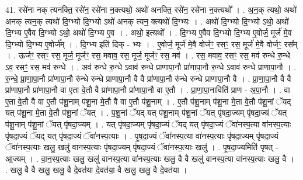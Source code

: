 \documentclass[17pt]{extarticle}
\begin{document}
41. रसे॑ना नक् त्यनक्ति॒ रसे॑न॒ रसे॑ना न॒क्त्यथो॒ अथो॑ अनक्ति॒ रसे॑न॒ रसे॑ना न॒क्त्यथो᳚ । . अ॒न॒क् त्यथो॒ अथो॑ अनक् त्यन॒क् त्यथो॑ दि॒ग्भ्यो दि॒ग्भ्यो ऽथो॑ अनक् त्यन॒ क्त्यथो॑ दि॒ग्भ्यः । . अथो॑ दि॒ग्भ्यो दि॒ग्भ्यो ऽथो॒ अथो॑ दि॒ग्भ्य ए॒वैव दि॒ग्भ्यो ऽथो॒ अथो॑ दि॒ग्भ्य ए॒व । . अथो॒ इत्यथो᳚ । . दि॒ग्भ्य ए॒वैव दि॒ग्भ्यो दि॒ग्भ्य ए॒वोर्ज॒ मूर्ज॑ मे॒व दि॒ग्भ्यो दि॒ग्भ्य ए॒वोर्ज᳚म् । . दि॒ग्भ्य इति॑ दिक् - भ्यः । . ए॒वोर्ज॒ मूर्ज॑ मे॒वै वोर्जꣳ॒॒ रसꣳ॒॒ रस॒ मूर्ज॑ मे॒वै वोर्जꣳ॒॒ रस᳚म् । . ऊर्जꣳ॒॒ रसꣳ॒॒ रस॒ मूर्ज॒ मूर्जꣳ॒॒ रस॒ मवाव॒ रस॒ मूर्ज॒ मूर्जꣳ॒॒ रस॒ मव॑ । . रस॒ मवाव॒ रसꣳ॒॒ रस॒ मव॑ रुन्धे रु॒न्धे ऽव॒ रसꣳ॒॒ रस॒ मव॑ रुन्धे । . अव॑ रुन्धे रु॒न्धे ऽवाव॑ रुन्धे प्राणापा॒नौ प्रा॑णापा॒नौ रु॒न्धे ऽवाव॑ रुन्धे प्राणापा॒नौ । . रु॒न्धे॒ प्रा॒णा॒पा॒नौ प्रा॑णापा॒नौ रु॑न्धे रुन्धे प्राणापा॒नौ वै वै प्रा॑णापा॒नौ रु॑न्धे रुन्धे प्राणापा॒नौ वै । . प्रा॒णा॒पा॒नौ वै वै प्रा॑णापा॒नौ प्रा॑णापा॒नौ वा ए॒ता वे॒तौ वै प्रा॑णापा॒नौ प्रा॑णापा॒नौ वा ए॒तौ । . प्रा॒णा॒पा॒नाविति॑ प्राण - अ॒पा॒नौ । . वा ए॒ता वे॒तौ वै वा ए॒तौ प॑शू॒नाम् प॑शू॒ना मे॒तौ वै वा ए॒तौ प॑शू॒नाम् । . ए॒तौ प॑शू॒नाम् प॑शू॒ना मे॒ता वे॒तौ प॑शू॒नां ॅयद् यत् प॑शू॒ना मे॒ता वे॒तौ प॑शू॒नां ॅयत् । . प॒शू॒नां ॅयद् यत् प॑शू॒नाम् प॑शू॒नां ॅयत् पृ॑षदा॒ज्यम् पृ॑षदा॒ज्यं ॅयत् प॑शू॒नाम् प॑शू॒नां ॅयत् पृ॑षदा॒ज्यम् । . यत् पृ॑षदा॒ज्यम् पृ॑षदा॒ज्यं ॅयद् यत् पृ॑षदा॒ज्यं ॅवा॑नस्प॒त्या वा॑नस्प॒त्याः पृ॑षदा॒ज्यं ॅयद् यत् पृ॑षदा॒ज्यं ॅवा॑नस्प॒त्याः । . पृ॒ष॒दा॒ज्यं ॅवा॑नस्प॒त्या वा॑नस्प॒त्याः पृ॑षदा॒ज्यम् पृ॑षदा॒ज्यं ॅवा॑नस्प॒त्याः खलु॒ खलु॑ वानस्प॒त्याः पृ॑षदा॒ज्यम् पृ॑षदा॒ज्यं ॅवा॑नस्प॒त्याः खलु॑ । . पृ॒ष॒दा॒ज्यमिति॑ पृषत् - आ॒ज्यम् । . वा॒न॒स्प॒त्याः खलु॒ खलु॑ वानस्प॒त्या वा॑नस्प॒त्याः खलु॒ वै वै खलु॑ वानस्प॒त्या वा॑नस्प॒त्याः खलु॒ वै । . खलु॒ वै वै खलु॒ खलु॒ वै दे॒वत॑या दे॒वत॑या॒ वै खलु॒ खलु॒ वै दे॒वत॑या । \newline
\pagebreak
{}
\end{document}
